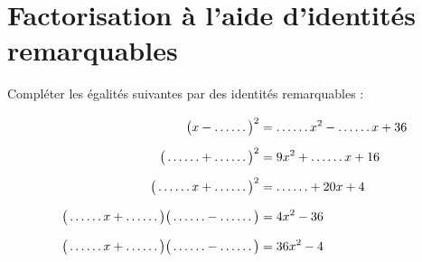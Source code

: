 %	

%	 
\newpage 
{}  
\pagestyle{scrheadings} %

\onehalfspacing    
\section{Factorisation à l'aide d'identités remarquables}

\begin{exercise} Compléter les égalités suivantes par des identités remarquables :
	\begin{align*}
		\big(x-\ldots\ldots\big)^2&=\ldots\ldots x^2-\ldots\ldots x+36 \rule{0pt}{1.6em} \\
		\big(\ldots\ldots+\ldots\ldots\big)^2&=9  x^2+\ldots\ldots x+16 \rule{0pt}{1.6em} \\ 
		\big(\ldots\ldots x+\ldots\ldots\big)^2&=\ldots\ldots+ 20 x+4\rule{0pt}{1.6em} \\
		\big(\ldots\ldots x+\ldots\ldots\big)\big(\ldots\ldots - \ldots\ldots\big)&=4x^2 -36\rule{0pt}{1.6em} \\ 
		\big(\ldots\ldots x+\ldots\ldots\big)\big(\ldots\ldots - \ldots\ldots\big)&=36x^2 -4\rule{0pt}{1.6em} 
	\end{align*} 
\end{exercise}

